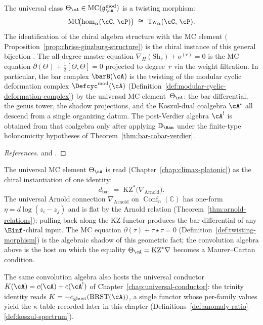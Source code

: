 \begin{corollary}[MC element = twisting morphism;
\ClaimStatusProvedElsewhere]
\label{cor:theta-twisting-morphism}
The universal class $\Theta_\cA \in
\mathrm{MC}(\mathfrak{g}_\cA^{\mathrm{mod}})$ is a twisting
morphism:
\[
\mathrm{MC}\!\bigl(\operatorname{hom}_\alpha(\cC,\, \cP)\bigr)
\;\cong\;
\mathrm{Tw}_\alpha(\cC,\, \cP).
\]
The identification of the chiral algebra structure with the MC element
$($Proposition~\textup{\ref{prop:chriss-ginzburg-structure}}$)$ is the chiral
instance of this general bijection
\textup{\cite[Theorem~4.6]{RNW19}}.
The all-degree master equation $\nabla_H(\mathrm{Sh}_r) + o^{(r)} = 0$
is the MC equation $\partial(\Theta) + \tfrac{1}{2}[\Theta, \Theta] = 0$
projected to degree~$r$ via the weight filtration.
In particular, the bar complex $\barB(\cA)$ is the twisting of the
modular cyclic deformation complex
$\Defcyc^{\mathrm{mod}}(\cA)$
\textup{(}Definition~\textup{\ref{def:modular-cyclic-deformation-complex})}
by the universal MC element~$\Theta_\cA$: the bar differential, the
genus tower, the shadow projections, and the Koszul-dual
coalgebra $\cA^i$ all descend from a single organizing datum.
The post-Verdier algebra $\cA^!$ is obtained from that coalgebra
only after applying $\mathbb{D}_{\Ran}$ under the finite-type
holonomicity hypotheses of Theorem~\ref{thm:bar-cobar-verdier}.
\end{corollary}

\begin{proof}[References]
\cite[Theorem~4.6]{RNW19} and \cite[Theorem~6.5.7]{LV12}.
\end{proof}

\begin{remark}
\label{rem:theta-as-kz-pullback}
The universal MC element
$\Theta_\cA$ is read (Chapter~\ref{chap:climax-platonic}) as the
chiral instantiation of one identity:
\[
d_{\mathrm{bar}} \;=\; \mathrm{KZ}^*\!\bigl(\nabla_{\mathrm{Arnold}}\bigr).
\]
The universal Arnold connection $\nabla_{\mathrm{Arnold}}$ on
$\operatorname{Conf}_n(\mathbb{C})$ has one-form
$\eta = d\log(z_i - z_j)$ and is flat by the Arnold relation
(Theorem~\ref{thm:arnold-relations}); pulling back along the
KZ functor produces the bar differential of any
$\Einf$-chiral input. The MC equation
$\partial(\tau) + \tau \star \tau = 0$
(Definition~\ref{def:twisting-morphism}) is the algebraic shadow
of this geometric fact; the convolution algebra above is the
host on which the equality $\Theta_\cA = \mathrm{KZ}^*\nabla$
becomes a Maurer--Cartan condition.

The same convolution algebra also hosts the universal conductor
$K(\cA) = c(\cA) + c(\cA^!)$ of
Chapter~\ref{chap:universal-conductor}: the trinity
identity reads $K = -c_{\mathrm{ghost}}(\mathrm{BRST}(\cA))$, a
single functor whose per-family values yield the $\kappa$-table
recorded later in this chapter
(Definitions~\ref{def:anomaly-ratio}--\ref{def:koszul-spectrum}).
\end{remark}

